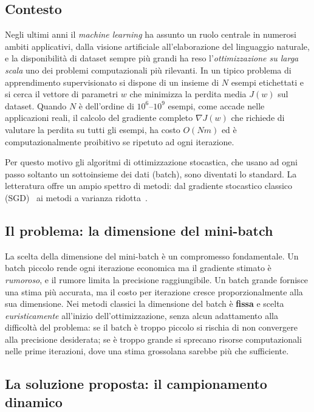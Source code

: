 \documentclass[a4paper,12pt]{article}
\numberwithin{equation}{section}
\numberwithin{figure}{section}
\numberwithin{table}{section}
\begin{document}
\subsection{Contesto}

Negli ultimi anni il \emph{machine learning} ha assunto un ruolo centrale in
numerosi ambiti applicativi, dalla visione artificiale all'elaborazione del
linguaggio naturale, e la disponibilità di dataset sempre più grandi ha reso
l'\emph{ottimizzazione su larga scala} uno dei problemi computazionali più
rilevanti. In un tipico problema di apprendimento supervisionato si dispone di
un insieme di $N$ esempi etichettati e si cerca il vettore di parametri $w$ che
minimizza la perdita media $J(w)$ sul dataset. Quando $N$ è dell'ordine di
$10^6$--$10^9$ esempi, come accade nelle applicazioni reali, il calcolo del
gradiente completo $\nabla J(w)$ che richiede di valutare la perdita su
tutti gli esempi, ha costo $O(Nm)$ ed è computazionalmente
proibitivo se ripetuto ad ogni iterazione.

Per questo motivo gli algoritmi di ottimizzazione stocastica, che usano ad ogni
passo soltanto un sottoinsieme dei dati (batch),
sono diventati lo standard. La letteratura offre un ampio spettro di
metodi: dal gradiente stocastico classico (SGD)~\cite{robbins1951, bottou2008}
ai metodi a varianza ridotta~\cite{defazio2014, johnson2013}.

\subsection{Il problema: la dimensione del mini-batch}

La scelta della dimensione del mini-batch è un compromesso fondamentale. Un
batch piccolo rende ogni iterazione economica ma il gradiente stimato è
\emph{rumoroso}, e il rumore limita la precisione raggiungibile. Un batch
grande fornisce una stima più accurata, ma il costo per iterazione cresce
proporzionalmente alla sua dimensione. Nei metodi classici la dimensione del
batch è \textbf{fissa} e scelta \emph{euristicamente} all'inizio
dell'ottimizzazione, senza alcun adattamento alla difficoltà del problema:
se il batch è troppo piccolo si rischia di non convergere alla precisione
desiderata; se è troppo grande si sprecano risorse computazionali nelle prime
iterazioni, dove una stima grossolana sarebbe più che sufficiente.

\subsection{La soluzione proposta: il campionamento dinamico}
\end{document}
